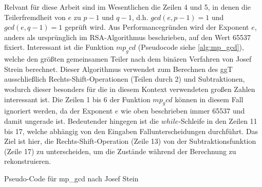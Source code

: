 Relvant für diese Arbeit sind im Wesentlichen die Zeilen 4 und 5, in denen die Teilerfremdheit von $e$ zu $p-1$ und $q-1$, d.h. $gcd(e,p-1) = 1$ und $gcd(e,q-1) = 1$ geprüft wird.
Aus Performancegründen wird der Exponent $e$, anders als ursprünglich im RSA-Algorithmus beschrieben, auf den Wert 65537 fixiert.
Interessant ist die Funktion $mp_gcd$ (Pseudocode siehe \ref{alg:mp_gcd}), welche den größten gemeinsamen Teiler nach dem binären Verfahren von Josef Strein \cite{} berechnet. Dieser Algorithmus verwendet zum Berechnen des ggT ausschließlich Rechts-Shift-Operationen (Teilen durch 2) und Subtraktionen, wodurch dieser besonders für die in diesem Kontext verwendeten großen Zahlen interessant ist.
Die Zeilen 1 bis 6 der Funktion $mp_gcd$ können in diesem Fall ignoriert werden, da der Exponent $e$ wie oben beschrieben immer 65537 und damit ungerade ist. Bedeutender hingegen ist die $while$-Schleife in den Zeilen 11 bis 17, welche abhängig von den Eingaben Fallunterscheidungen durchführt. Das Ziel ist hier, die Rechts-Shift-Operation (Zeile 13) von der Subtraktionsfunktion (Zeile 17) zu unterscheiden, um die Zustände während der Berechnung zu rekonstruieren. 

\begin{algorithm}[h]
\DontPrintSemicolon
\caption{Pseudo-Code für mp_gcd nach Josef Stein}
\label{alg:mp_gcd}

\end{algorithm}